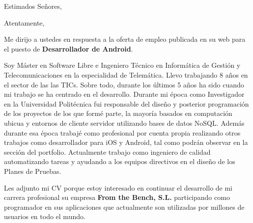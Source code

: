 \clearpage
\date{Noviembre 22, 2014}
\opening{Estimados Señores,}
\closing{Atentamente,}
\makelettertitle

Me dirijo a ustedes en respuesta a la oferta de empleo publicada en su web para el puesto de \textbf{Desarrollador de Android}.  


Soy Máster en Software Libre e Ingeniero Técnico en Informática de Gestión y Telecomunicaciones en la especialidad de Telemática. Llevo trabajando 8 años en el sector de las las TICs. Sobre todo, durante los últimos 5 años ha sido cuando mi trabajo se ha centrado en el desarrollo. Durante mi época como Investigador en la Universidad Politécnica fui responsable del diseño y posterior programación de los proyectos de los que formé parte, la mayoría basados en computación ubicua y entornos de cliente servidor utilizando bases de datos NoSQL. Además durante esa época trabajé como profesional por cuenta propia realizando otros trabajos como desarrollador para iOS y Android, tal como podrán observar en la sección del portfolio. Actualmente trabajo como ingeniero de calidad automatizando tareas y ayudando a los equipos directivos en el diseño de los Planes de Pruebas.

Les adjunto mi CV porque estoy interesado en continuar el desarrollo de mi carrera profesional su empresa \textbf{From the Bench, S.L.} participando como programador en sus aplicaciones que actualmente son utilizadas por millones de usuarios en todo el mundo.

\makeletterclosing